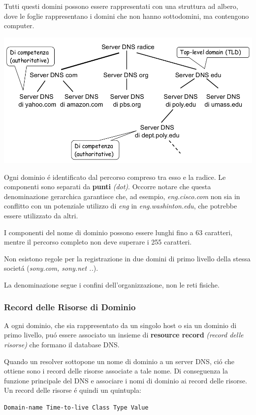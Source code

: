 \documentclass[12pt]{article}
\def\code#1{\texttt{#1}}
\begin{document}
Tutti questi domini possono essere rappresentati con una struttura ad albero, dove le foglie rappresentano i domini che non 
hanno sottodomini, ma contengono computer.
\begin{center}
	\includegraphics[scale=0.35]{applicazione-img4.png}
\end{center}
Ogni dominio \'e identificato dal percorso compreso tra esso e la radice. Le componenti sono separati da \textbf{punti} 
\textit{(dot)}. Occorre notare che questa denominazione gerarchica garantisce che, ad esempio, \textit{eng.cisco.com} non sia in 
conflitto con un potenziale utilizzo di \textit{eng} in \textit{eng.washinton.edu}, che potrebbe essere utilizzato da altri.

I componenti del nome di dominio possono essere lunghi fino a 63 caratteri, mentre il percorso completo non deve superare i 255 
caratteri.

Non esistono regole per la registrazione in due domini di primo livello della stessa societ\'a (\textit{sony.com, sony.net ..}).

La denominazione segue i confini dell'organizzazione, non le reti fisiche.

\subsubsection{Record delle Risorse di Dominio}\label{dns-record-delle-risorse-di-dominio}
A ogni dominio, che sia rappresentato da un singolo host o sia un dominio di primo livello, pu\'o essere associato un insieme di 
\textbf{resource record} \textit{(record delle risorse)} che formano il database DNS.

Quando un resolver sottopone un nome di dominio a un server DNS, ci\'o che ottiene sono i record delle risorse associate a tale 
nome. Di conseguenza la funzione principale del DNS e associare i nomi di dominio ai record delle risorse. Un record delle 
risorse \'e quindi un quintupla:
\begin{center}
	\code{Domain-name Time-to-live Class Type Value}
\end{center}
\end{document}
